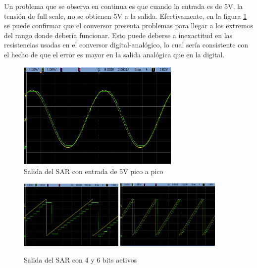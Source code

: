 \documentclass[assd_tp3_main.tex]{subfiles}
\begin{document}
Un problema que se observa en continua es que cuando la entrada es de 5V, la tensi\'on de full scale, no se obtienen 5V a la salida. Efectivamente, en la figura \ref{fig:sar-fs} se puede confirmar que el conversor presenta problemas para llegar a los extremos del rango donde deber\'ia funcionar. Esto puede deberse a inexactitud en las resistencias usadas en el conversor digital-anal\'ogico, lo cual ser\'ia consistente con el hecho de que el error es mayor en la salida anal\'ogica que en la digital.

\begin{figure}
	\centering
	\includegraphics[width=0.7\textwidth]
	{images/ej2/ss_.png}
	\caption{Salida del SAR con entrada de 5V pico a pico}
	\label{fig:sar-fs}
\end{figure}

\begin{figure}[htb!]
	\centering
	\includegraphics[width=0.45\textwidth]
	{images/ej2/s_4.png}
	\includegraphics[width=0.45\textwidth]
	{images/ej2/s_8.png}
	\caption{Salida del SAR con 4 y 6 bits activos}
	\label{fig:sar-bits}
\end{figure}
\end{document}
